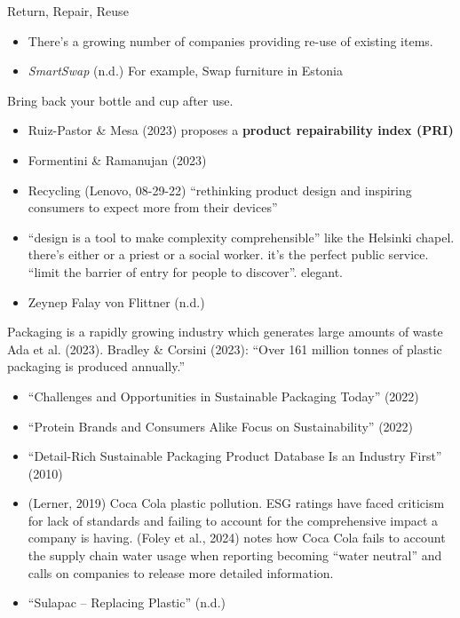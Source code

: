 \documentclass[
  letterpaper,
  DIV=11,
  numbers=noendperiod]{scrartcl}
\providecommand{\tightlist}{%
  \setlength{\itemsep}{0pt}\setlength{\parskip}{0pt}}\usepackage{longtable,booktabs,array}
\begin{document}
Return, Repair, Reuse

\begin{itemize}
\tightlist
\item
  There's a growing number of companies providing re-use of existing
  items.
\item
  \emph{{SmartSwap}} (n.d.) For example, Swap furniture in Estonia
\end{itemize}

Bring back your bottle and cup after use.

\begin{itemize}
\tightlist
\item
  Ruiz-Pastor \& Mesa (2023) proposes a \textbf{product repairability
  index (PRI)}
\item
  Formentini \& Ramanujan (2023)
\item
  Recycling (Lenovo, 08-29-22) ``rethinking product design and inspiring
  consumers to expect more from their devices''
\item
  ``design is a tool to make complexity comprehensible'' like the
  Helsinki chapel. there's either or a priest or a social worker. it's
  the perfect public service. ``limit the barrier of entry for people to
  discover''. elegant.
\item
  Zeynep Falay von Flittner (n.d.)
\end{itemize}

Packaging is a rapidly growing industry which generates large amounts of
waste Ada et al. (2023). Bradley \& Corsini (2023): ``Over 161 million
tonnes of plastic packaging is produced annually.''

\begin{itemize}
\tightlist
\item
  {``Challenges and {Opportunities} in {Sustainable Packaging Today}''}
  (2022)
\item
  {``Protein {Brands} and {Consumers Alike Focus} on {Sustainability}''}
  (2022)
\item
  {``Detail-Rich Sustainable Packaging {Product Database} Is an Industry
  First''} (2010)
\item
  (Lerner, 2019) Coca Cola plastic pollution. ESG ratings have faced
  criticism for lack of standards and failing to account for the
  comprehensive impact a company is having. (Foley et al., 2024) notes
  how Coca Cola fails to account the supply chain water usage when
  reporting becoming ``water neutral'' and calls on companies to release
  more detailed information.
\item
  {``Sulapac -- {Replacing} Plastic''} (n.d.)
\end{itemize}
\end{document}
